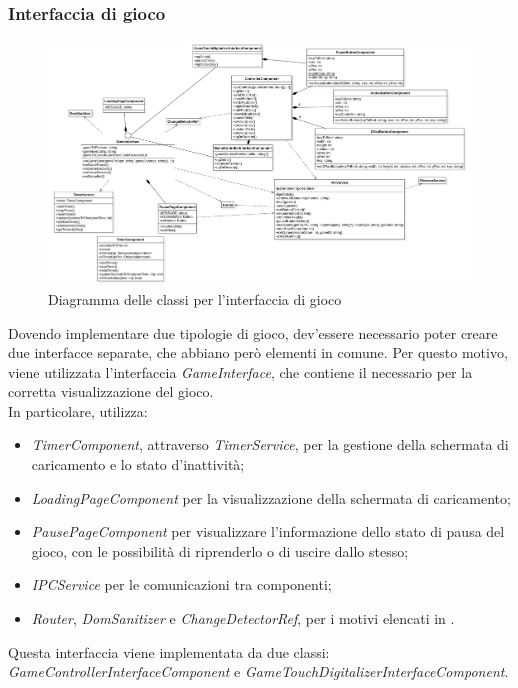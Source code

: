 \subsubsection{Interfaccia di gioco}
\begin{figure}[h]
    \centering
    \includegraphics[width=340pt]{images/prog/GameInterface.png}
    \caption{Diagramma delle classi per l'interfaccia di gioco}
    \label{fig:gameinterface}
\end{figure}
Dovendo implementare due tipologie di gioco, dev'essere necessario poter creare due interfacce separate, che abbiano però elementi in comune.
Per questo motivo, viene utilizzata l'interfaccia \emph{GameInterface}, che contiene il necessario per la corretta visualizzazione del gioco.\\
In particolare, utilizza:
\begin{itemize}
    \item \emph{TimerComponent}, attraverso \emph{TimerService}, per la gestione della schermata di caricamento e lo stato d'inattività;
    \item \emph{LoadingPageComponent} per la visualizzazione della schermata di caricamento;
    \item \emph{PausePageComponent} per visualizzare l'informazione dello stato di pausa del gioco, con le possibilità di riprenderlo o di uscire dallo stesso;
    \item \emph{IPCService} per le comunicazioni tra componenti;
    \item \emph{Router}, \emph{DomSanitizer} e \emph{ChangeDetectorRef}, per i motivi elencati in .
\end{itemize}
Questa interfaccia viene implementata da due classi: \emph{GameControllerInterfaceComponent} e \emph{GameTouchDigitalizerInterfaceComponent}.
\newpage
